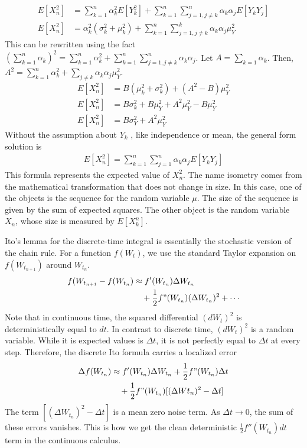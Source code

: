 \begin{align*}
E[X_n^2] &= \sum_{k=1}^n \alpha_k^2 E[Y_k^2]+ \sum_{k=1}^n\sum_{j=1,j\ne k}^n \alpha_k\alpha_jE[Y_kY_j]\\
E[X_n^2] &= \alpha_k^2(\sigma_k^2 + \mu_k^2) + \sum_{k=1}^n\sum_{j=1, j\ne k}^k \alpha_k\alpha_j \mu_Y^2
\end{align*}
This can be rewritten using the fact $(\sum_{k=1}^n\alpha_k)^2 = \sum_{k=1}^n\alpha_k^2 + \sum_{k=1}^n \sum_{j=1,j \ne k}^n \alpha_k\alpha_j$.  Let $A=\sum_{k=1}\alpha_k$. Then, $A^2=\sum_{k=1}^n \alpha_k^2 + \sum_{j\ne k} \alpha_k \alpha_j\mu_Y^2$.
\begin{align*}
E[X_n^2] &=  B(\mu_k^2 + \sigma_k^2) + (A^2-B)\mu_Y^2\\
E[X_n^2] &= B\sigma_k^2 + B\mu_Y^2 + A^2\mu_Y^2 - B\mu_Y^2\\
E[X_n^2] &= B\sigma_Y^2 + A^2\mu_Y^2
\end{align*}
Without the assumption about $Y_k$ , like independence or mean, the general form solution is
\begin{align*}
E[X_n^2]=\sum_{k=1}^n\sum_{j=1}^n \alpha_k\alpha_j E[Y_kY_j]
\end{align*}
This formula represents the expected value of $X_n^2$. The name isometry comes from the mathematical transformation that does not change in size. In this case, one of the objects is the sequence for the random variable $\mu$. The size of the sequence is given by the sum of expected squares. The other object is the random variable $X_n$, whose size is measured by $E[X_k^n]$.

Ito's lemma for the discrete-time integral is essentially the stochastic version of the chain rule. For a function $f(W_t)$, we use the standard Taylor expansion on $f(W_{t_{n+1}})$ around $W_{t_n}$.
\begin{align*}
f(W_{t_{n+1}} - f(W_{t_n}) &\approx f'(W_{t_n}) \Delta W_{t_n} \\
&\quad + \frac{1}{2} f"(W_{t_n}) (\Delta W_{t_n})^2 + \cdots
\end{align*}
Note that in continuous time, the squared differential $(dW_t)^2$ is deterministically equal to $dt$. In contrast to discrete time, $(dW_t)^2$ is a random variable. While it is expected values is $\Delta t$, it is not perfectly equal to $\Delta t$ at every step. Therefore, the discrete Ito formula carries a localized error
\begin{align*}
\Delta f(W_{t_n}) &\approx f'(W_{t_n})\Delta W_{t_n} +  \frac{1}{2}f"(W_{t_n})\Delta t \\
&\quad + \frac{1}{2} f"(W_{t_n }) [(\Delta W t_n)^2 - \Delta t]
\end{align*}
The term $[(\Delta W_{t_n})^2 - \Delta t]$ is a mean zero noise term. As $\Delta t \rightarrow 0$,  the sum of these errors vanishes. This is how we get the clean deterministic $\frac{1}{2} f''(W_{t_n})dt$ term in the continuous calculus.

